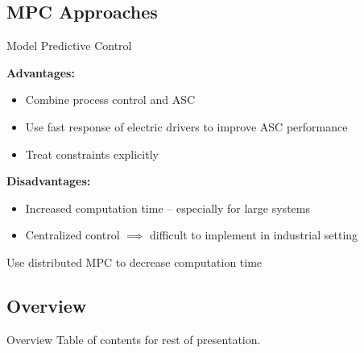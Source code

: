 \subsection{MPC Approaches}
\begin{frame}{Model Predictive Control}

  {\bfseries Advantages:\\}
  \begin{itemize}
    \item Combine process control and ASC
    \item Use fast response of electric drivers to improve ASC performance
    \item Treat constraints explicitly
  \end{itemize}
  \vspace{1em}
  {\bfseries Disadvantages:\\}
  \begin{itemize}
    \item Increased computation time -- especially for large systems
    \item Centralized control $\implies$ difficult to implement in industrial setting
  \end{itemize}
  \vspace{1em}

  \pause

  {\centering
    \alert{Use distributed MPC to decrease computation time}\\
  }

\end{frame}


\subsection{Overview}
\begin{frame}{Overview}
  Table of contents for rest of presentation.
\end{frame}

